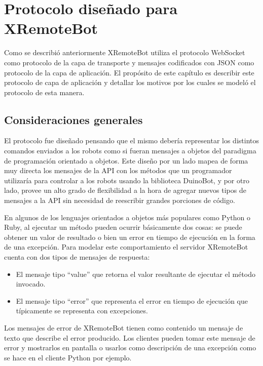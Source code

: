 \section{Protocolo diseñado para XRemoteBot}

Como se describió anteriormente XRemoteBot utiliza el protocolo WebSocket como
protocolo de la capa de transporte y mensajes codificados con JSON como
protocolo de la capa de aplicación. El propósito de este capítulo es describir
este protocolo de capa de aplicación y detallar los motivos por los cuales
se modeló el protocolo de esta manera.

\subsection{Consideraciones generales}


El protocolo fue diseñado pensando que el mismo debería representar los
distintos comandos enviados a los robots como si fueran mensajes a objetos
del paradigma de programación orientado a objetos. Este diseño por un lado
mapea de forma muy directa los mensajes de la API
con los métodos que un programador utilizaría para controlar a los robots
usando la biblioteca DuinoBot,  y por otro lado, provee un alto grado de
flexibilidad a la hora de agregar nuevos tipos de mensajes a la API sin
necesidad de reescribir grandes porciones de código.

En algunos de los lenguajes orientados a objetos más populares como Python
o Ruby, al ejecutar un método pueden ocurrir básicamente dos cosas:
se puede obtener un valor de resultado o bien un error
en tiempo de ejecución en la forma de una excepción. Para modelar este
comportamiento el servidor XRemoteBot cuenta con dos tipos de mensajes
de respuesta:

\begin{itemize}
    \item El mensaje tipo ``value'' que retorna el valor resultante de
        ejecutar el método invocado.
    \item El mensaje tipo ``error'' que representa el error en tiempo
        de ejecución que típicamente se representa con excepciones.
\end{itemize}

Los mensajes de error de XRemoteBot tienen como contenido
un mensaje de texto que describe el error producido. Los clientes
pueden tomar este mensaje
de error y mostrarlos en pantalla o usarlos como descripción de una
excepción como se hace en el cliente Python por ejemplo.

